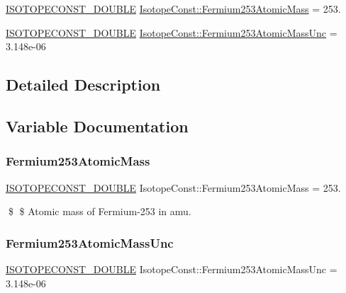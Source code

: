 \begin{DoxyCompactItemize}
\item 
\mbox{\hyperlink{group___isotope_const-_macros_ga8f45a7272ce02c0b4c65c44636ed719a}{I\+S\+O\+T\+O\+P\+E\+C\+O\+N\+S\+T\+\_\+\+D\+O\+U\+B\+LE}} \mbox{\hyperlink{group___isotope_const-_fermium-_fm253_gae79631c7369bae5412fd52d519e94929}{Isotope\+Const\+::\+Fermium253\+Atomic\+Mass}} = 253.
\item 
\mbox{\hyperlink{group___isotope_const-_macros_ga8f45a7272ce02c0b4c65c44636ed719a}{I\+S\+O\+T\+O\+P\+E\+C\+O\+N\+S\+T\+\_\+\+D\+O\+U\+B\+LE}} \mbox{\hyperlink{group___isotope_const-_fermium-_fm253_ga11b7d1cf8f75bf3cfcd3b5036d0dc962}{Isotope\+Const\+::\+Fermium253\+Atomic\+Mass\+Unc}} = 3.\+148e-\/06
\end{DoxyCompactItemize}


\subsection{Detailed Description}


\subsection{Variable Documentation}
\mbox{\label{group___isotope_const-_fermium-_fm253_gae79631c7369bae5412fd52d519e94929}} 
\subsubsection{\texorpdfstring{Fermium253\+Atomic\+Mass}{Fermium253AtomicMass}}
{\footnotesize\ttfamily \mbox{\hyperlink{group___isotope_const-_macros_ga8f45a7272ce02c0b4c65c44636ed719a}{I\+S\+O\+T\+O\+P\+E\+C\+O\+N\+S\+T\+\_\+\+D\+O\+U\+B\+LE}} Isotope\+Const\+::\+Fermium253\+Atomic\+Mass = 253.}

\$ \$ Atomic mass of Fermium-\/253 in amu. \mbox{\label{group___isotope_const-_fermium-_fm253_ga11b7d1cf8f75bf3cfcd3b5036d0dc962}} 
\subsubsection{\texorpdfstring{Fermium253\+Atomic\+Mass\+Unc}{Fermium253AtomicMassUnc}}
{\footnotesize\ttfamily \mbox{\hyperlink{group___isotope_const-_macros_ga8f45a7272ce02c0b4c65c44636ed719a}{I\+S\+O\+T\+O\+P\+E\+C\+O\+N\+S\+T\+\_\+\+D\+O\+U\+B\+LE}} Isotope\+Const\+::\+Fermium253\+Atomic\+Mass\+Unc = 3.\+148e-\/06}

